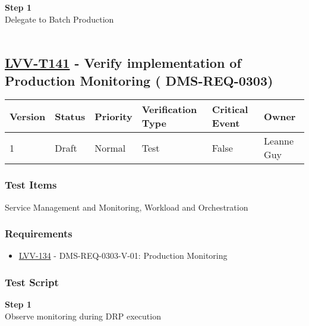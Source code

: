 \textbf{Step 1}\\
Delegate to Batch Production\\
~\\

\hypertarget{lvv-t141---verify-implementation-of-production-monitoring-dms-req-0303}{%
\subsection{\texorpdfstring{\href{https://jira.lsstcorp.org/secure/Tests.jspa\#/testCase/LVV-T141}{LVV-T141}
- Verify implementation of Production Monitoring (
DMS-REQ-0303)}{LVV-T141 - Verify implementation of Production Monitoring ( DMS-REQ-0303)}}\label{lvv-t141---verify-implementation-of-production-monitoring-dms-req-0303}}

\begin{longtable}[]{@{}llllll@{}}
\toprule
Version & Status & Priority & Verification Type & Critical Event &
Owner\tabularnewline
\midrule
\endhead
1 & Draft & Normal & Test & False & Leanne Guy\tabularnewline
\bottomrule
\end{longtable}

\hypertarget{test-items-117}{%
\subsubsection{Test Items}\label{test-items-117}}

Service Management and Monitoring, Workload and Orchestration~

\hypertarget{requirements-118}{%
\subsubsection{Requirements}\label{requirements-118}}

\begin{itemize}
\tightlist
\item
  \href{https://jira.lsstcorp.org/browse/LVV-134}{LVV-134} -
  DMS-REQ-0303-V-01: Production Monitoring
\end{itemize}

\hypertarget{test-script-118}{%
\subsubsection{Test Script}\label{test-script-118}}

\textbf{Step 1}\\
Observe monitoring during DRP execution\\
~\\

